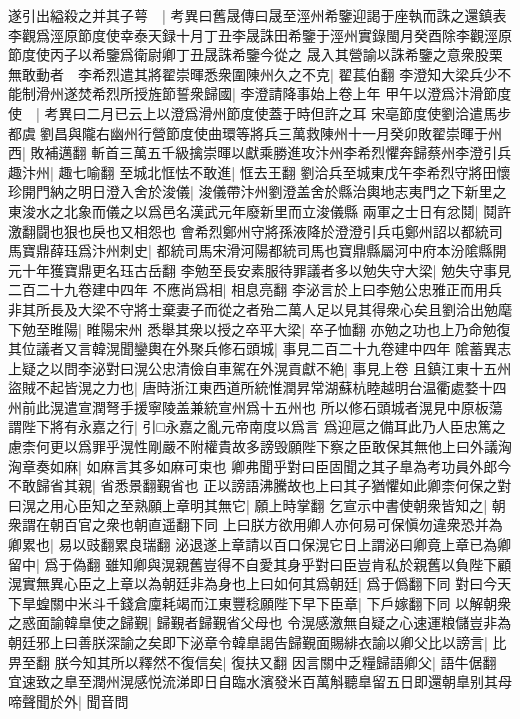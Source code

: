遂引出縊殺之并其子萼　|{
	考異曰舊晟傳曰晟至涇州希鑒迎謁于座執而誅之還鎮表李觀爲涇原節度使幸泰天録十月丁丑李晟誅田希鑒于涇州實錄閩月癸酉除李觀涇原節度使丙子以希鑒爲衛尉卿丁丑晟誅希鑒今從之}
晟入其營諭以誅希鑒之意衆股栗無敢動者　李希烈遣其將翟崇暉悉衆圍陳州久之不克|{
	翟萇伯翻}
李澄知大梁兵少不能制滑州遂焚希烈所授旌節誓衆歸國|{
	李澄請降事始上卷上年}
甲午以澄爲汴滑節度使　|{
	考異曰二月已云上以澄爲滑州節度使蓋于時但許之耳}
宋亳節度使劉洽遣馬步都虞劉昌與隴右幽州行營節度使曲環等將兵三萬救陳州十一月癸卯敗翟崇暉于州西|{
	敗補邁翻}
斬首三萬五千級擒崇暉以獻乘勝進攻汴州李希烈懼奔歸蔡州李澄引兵趣汴州|{
	趣七喻翻}
至城北恇怯不敢進|{
	恇去王翻}
劉洽兵至城東戊午李希烈守將田懷珍開門納之明日澄入舍於浚儀|{
	浚儀帶汴州劉澄盖舍於縣治輿地志夷門之下新里之東浚水之北象而儀之以爲邑名漢武元年廢新里而立浚儀縣}
兩軍之士日有忿鬩|{
	鬩許激翻闘也狠也戾也又相怨也}
會希烈鄭州守將孫液降於澄澄引兵屯鄭州詔以都統司馬寶鼎薛珏爲汴州刺史|{
	都統司馬宋滑河陽都統司馬也寶鼎縣屬河中府本汾隂縣開元十年獲寶鼎更名珏古岳翻}
李勉至長安素服待罪議者多以勉失守大梁|{
	勉失守事見二百二十九卷建中四年}
不應尚爲相|{
	相息亮翻}
李泌言於上曰李勉公忠雅正而用兵非其所長及大梁不守將士棄妻子而從之者殆二萬人足以見其得衆心矣且劉洽出勉麾下勉至睢陽|{
	睢陽宋州}
悉舉其衆以授之卒平大梁|{
	卒子恤翻}
亦勉之功也上乃命勉復其位議者又言韓滉聞鑾輿在外聚兵修石頭城|{
	事見二百二十九卷建中四年}
隂蓄異志上疑之以問李泌對曰滉公忠清儉自車駕在外滉貢獻不絶|{
	事見上卷}
且鎮江東十五州盜賊不起皆滉之力也|{
	唐時浙江東西道所統惟潤昇常湖蘇杭睦越明台温衢處婺十四州前此滉遣宣潤弩手援寧陵盖兼統宣州爲十五州也}
所以修石頭城者滉見中原板蕩謂陛下將有永嘉之行|{
	引□永嘉之亂元帝南度以爲言}
爲迎扈之備耳此乃人臣忠篤之慮柰何更以爲罪乎滉性剛嚴不附權貴故多謗毁願陛下察之臣敢保其無他上曰外議洶洶章奏如麻|{
	如麻言其多如麻可束也}
卿弗聞乎對曰臣固聞之其子臯為考功員外郎今不敢歸省其親|{
	省悉景翻覲省也}
正以謗語沸騰故也上曰其子猶懼如此卿柰何保之對曰滉之用心臣知之至熟願上章明其無它|{
	願上時掌翻}
乞宣示中書使朝衆皆知之|{
	朝衆謂在朝百官之衆也朝直遥翻下同}
上曰朕方欲用卿人亦何易可保愼勿違衆恐并為卿累也|{
	易以豉翻累良瑞翻}
泌退遂上章請以百口保滉它日上謂泌曰卿竟上章已為卿留中|{
	爲于偽翻}
雖知卿與滉親舊豈得不自愛其身乎對曰臣豈肯私於親舊以負陛下顧滉實無異心臣之上章以為朝廷非為身也上曰如何其爲朝廷|{
	爲于僞翻下同}
對曰今天下旱蝗關中米斗千錢倉廩耗竭而江東豐稔願陛下早下臣章|{
	下戶嫁翻下同}
以解朝衆之惑面諭韓臯使之歸覲|{
	歸覲者歸覲省父母也}
令滉感激無自疑之心速運粮儲豈非為朝廷邪上曰善朕深諭之矣即下泌章令韓臯謁告歸覲面賜緋衣諭以卿父比以謗言|{
	比畀至翻}
朕今知其所以釋然不復信矣|{
	復扶又翻}
因言關中乏糧歸語卿父|{
	語牛倨翻}
宜速致之臯至潤州滉感悦流涕即日自臨水濱發米百萬斛聽臯留五日即還朝臯别其母啼聲聞於外|{
	聞音問}
